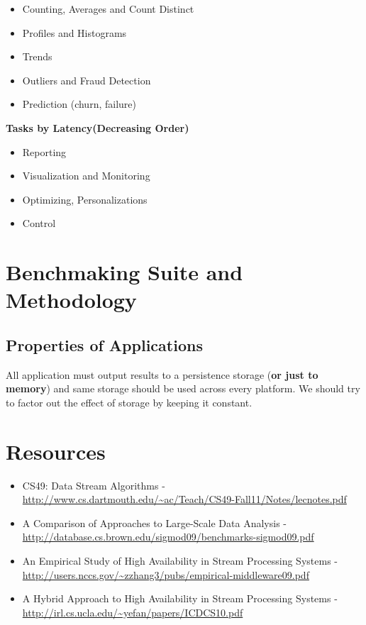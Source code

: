 \documentclass{sig-alternate}
\begin{document}
 \begin{itemize}
  \item Counting, Averages and Count Distinct
  \item Profiles and Histograms
  \item Trends
  \item Outliers and Fraud Detection
  \item Prediction (churn, failure)
 \end{itemize}

\textbf{Tasks by Latency(Decreasing Order)}
\begin{itemize}
 \item Reporting
 \item Visualization and Monitoring
 \item Optimizing, Personalizations
 \item Control
\end{itemize}

\section{Benchmaking Suite and Methodology}

\subsection{Properties of Applications}

All application must output results to a persistence storage (\textbf{or just to memory}) and same
storage should be used across every platform. We should try to factor out the effect of storage by
keeping it constant.

\section{Resources}

\begin{itemize}
 \item CS49: Data Stream Algorithms - \url{http://www.cs.dartmouth.edu/~ac/Teach/CS49-Fall11/Notes/lecnotes.pdf}
 \item A Comparison of Approaches to Large-Scale Data Analysis - \url{http://database.cs.brown.edu/sigmod09/benchmarks-sigmod09.pdf}
 \item An Empirical Study of High Availability in Stream Processing Systems - \url{http://users.nccs.gov/~zzhang3/pubs/empirical-middleware09.pdf}
   \item A Hybrid Approach to High Availability in Stream Processing Systems - \url{http://irl.cs.ucla.edu/~yefan/papers/ICDCS10.pdf}
\end{itemize}



\end{document}
